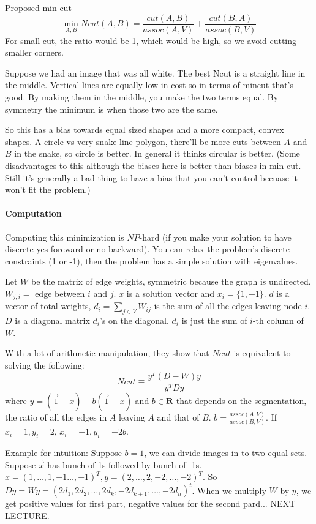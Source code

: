 Proposed min cut
\begin{equation}
  \label{eq:39}
  \min_{A,B} Ncut(A,B) = \frac{cut(A,B)}{assoc(A,V)} + \frac{cut(B,A)}{assoc(B,V)} 
\end{equation}
For small cut, the ratio would be 1, which would be high, so we avoid
cutting smaller corners.

Suppose we had an image that was all white. The best Ncut is a
straight line in the middle. Vertical lines are equally low in cost so
in terms of mincut that's good. By making them in the middle, you make
the two terms equal. By symmetry the minimum is when those two are the
same.

So this has a bias towards equal sized shapes and a more compact,
convex shapes. A circle vs very snake line polygon, there'll be more cuts
between $A$ and $B$ in the snake, so circle is better. In general it thinks circular is
better. (Some disadvantages to this although the biases here is better
than biases in min-cut. Still it's generally a bad thing to have a
bias that you can't control becuase it won't fit the problem.)

\paragraph{Computation}
\label{sec:computation}
Computing this minimization is $NP$-hard (if you make your solution to
have discrete yes foreward or no backward). You can relax the
problem's discrete constraints (1 or -1), then the problem has a
simple solution with eigenvalues.

Let $W$ be the matrix of edge weights, symmetric because the graph is
undirected. $W_{j,i} = $ edge between $i$ and $j$. $x$ is a solution
vector and $x_i = \{1, -1\}$.
$d$ is a vector of total weights, $d_i = \sum_{j\in V} W_{ij}$ is the
sum of all the edges leaving node $i$.
$D$ is a diagonal matrix $d_i$'s on the diagonal. $d_i$ is just the
sum of $i$-th column of $W$.

With a lot of arithmetic manipulation, they show that $Ncut$ is
equivalent to solving the following:
\begin{equation}
  \label{eq:40}
  Ncut \equiv \frac{y^T(D-W)y}{y^TDy}
\end{equation}
where $y = (\vec 1+x) - b(\vec 1-x)$ and $b\in \mathbf{R}$ that depends on the
segmentation, the ratio of all the edges in $A$ leaving $A$ and that
of $B$. $b = \frac{ assoc(A,V)}{assoc(B,V)}$. If $x_i=1, y_i = 2$,
$x_i=-1, y_i = -2b$.

Example for intuition: Suppose $b = 1$, we can divide images in to two
equal sets. Suppose $\vec x$ has bunch of 1s followed by bunch of
-1s. $x = (1,  \dots, 1, -1 \dots, -1)^T, y = (2, \dots, 2, -2, \dots,
-2)^T$. So $Dy = Wy = (2d_1, 2d_2, \dots,  2d_k, -2d_{k+1}, \dots, -2d_n)^t$. When we multiply $W$ by $y$, we get positive values for first
part, negative values for the second pard... NEXT LECTURE.

